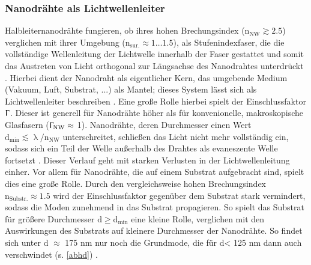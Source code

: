 \subsubsection{Nanodrähte als Lichtwellenleiter}
Halbleiternanodrähte fungieren, ob ihres hohen Brechungsindex ($\text{n}_\text{NW} \gtrsim 2.5$) verglichen mit ihrer Umgebung ($\text{n}_\text{sur.} \approx 1\ldots 1.5$), als Stufenindexfaser, die die vollständige Wellenleitung der Lichtwelle innerhalb der Faser gestattet und somit das Austreten von Licht orthogonal zur Längsachse des Nanodrahtes unterdrückt \cite{Yao.2009}. Hierbei dient der Nanodraht als eigentlicher Kern, das umgebende Medium (Vakuum, Luft, Substrat, ...) als Mantel; dieses System lässt sich als Lichtwellenleiter beschreiben \cite{Pan.2005}. Eine große Rolle hierbei spielt der Einschlussfaktor $\Upgamma$. Dieser ist generell für Nanodrähte höher als für konvenionelle, makroskopische Glasfasern ($\Upgamma_\text{NW} \approx$ 1). Nanodrähte, deren Durchmesser einen Wert $\text{d}_\text{min}\lesssim \uplambda / \text{n}_\text{NW}$ unterschreitet, schließen das Licht nicht mehr vollständig ein, sodass sich ein Teil der Welle außerhalb des Drahtes als evaneszente Welle fortsetzt \cite{Voss.2007}. Dieser Verlauf geht mit starken Verlusten in der Lichtwellenleitung einher. Vor allem für Nanodrähte, die auf einem Substrat aufgebracht sind, spielt dies eine große Rolle. Durch den vergleichsweise hohen Brechungsindex $\text{n}_\text{Substr.} \approx 1.5$ wird der Einschlussfaktor gegenüber dem Substrat stark vermindert, sodass die Moden zunehmend in das Substrat propagieren. So spielt das Substrat für größere Durchmesser $\text{d} \geq \text{d}_\text{min}$ eine kleine Rolle, verglichen mit den Auswirkungen des Substrats auf kleinere Durchmesser der Nanodrähte. So findet sich unter d $\approx$ 175 nm nur noch die Grundmode, die für d< 125 nm dann auch verschwindet (s. \autoref{abhd}) \cite{Roeder.Diss}.\\
